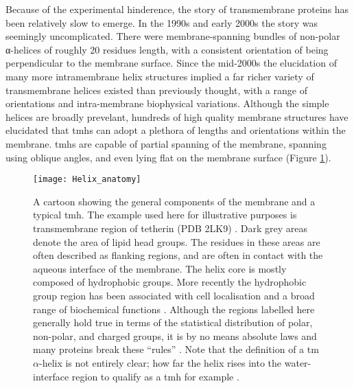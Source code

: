 Because of the experimental hinderence, the story of transmembrane proteins has been relatively slow to emerge. In the 1990s and early 2000s the story was seemingly uncomplicated. There were membrane-spanning bundles of non-polar α-helices of roughly 20 residues length, with a consistent orientation of being perpendicular to the membrane surface. Since the mid-2000s the elucidation of many more intramembrane helix structures implied a far richer variety of transmembrane helices existed than previously thought, with a range of orientations and intra-membrane biophysical variations. Although the simple helices are broadly prevelant, hundreds of high quality membrane structures have elucidated that \gls{tmh}s can adopt a plethora of lengths and orientations within the membrane. \gls{tmh}s are capable of partial spanning of the membrane, spanning using oblique angles, and even lying flat on the membrane surface \cite{VonHeijne2006, Elofsson2007} (Figure \ref{fig:helixcartoon1}).

\begin{figure}[!ht]
\centering
\texttt{[image: Helix\_anatomy]}
\caption{A cartoon showing the general components of the membrane and a typical \gls{tmh}. The example used here for illustrative purposes is transmembrane region of tetherin (PDB 2LK9) \cite{Skasko2012}. Dark grey areas denote the area of lipid head groups. The residues in these areas are often described as flanking regions, and are often in contact with the aqueous interface of the membrane. The helix core is mostly composed of hydrophobic groups. More recently the hydrophobic group region has been associated with cell localisation and a broad range of biochemical functions \cite{Junne2010, Wong2012}. Although the regions labelled here generally hold true in terms of the statistical distribution of polar, non-polar, and charged groups, it is by no means absolute laws and many proteins break these ``rules'' \cite{Sharpe2010, Baeza-Delgado2013, Pogozheva2013}. Note that the definition of a \gls{tm} $\alpha$-helix is not entirely clear; how far the helix rises into the water-interface region to qualify as a \gls{tmh} for example \cite{VonHeijne2006}.}
\label{fig:helixcartoon1}
\end{figure}




